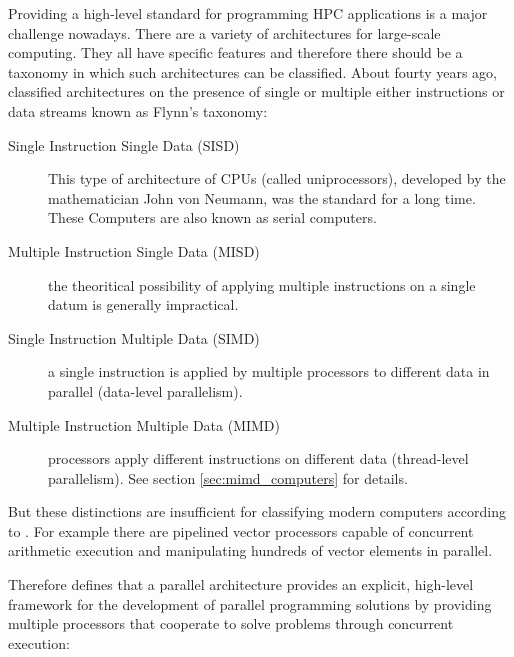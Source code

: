 Providing a high-level standard for programming HPC applications is a
major challenge nowadays. There are a variety of architectures for
large-scale computing. They all have specific features and 
therefore there should be a taxonomy in which such architectures can
be classified. About fourty years ago, \cite{flynn72sco} classified
architectures on the
presence of single or multiple either instructions or data streams
known as Flynn's taxonomy:
\begin{description}
\item[Single Instruction Single Data (SISD)]
  This type of architecture of CPUs (called uniprocessors),
  developed by the 
  mathematician John von Neumann, was the standard for a long
  time. These Computers are also known as serial computers. 
\item[Multiple Instruction Single Data (MISD)] the theoritical possibility
  of applying multiple instructions on a single datum is generally
  impractical.
\item[Single Instruction Multiple Data (SIMD)] 
  a single instruction is applied by multiple processors to different
  data in parallel (data-level parallelism). 
\item[Multiple Instruction Multiple Data (MIMD)] processors apply
  different instructions on different data (thread-level
  parallelism). See section \ref{sec:mimd_computers} for details. 
\end{description}

But these distinctions are insufficient for classifying modern
computers according to \cite{duncan90survey}. For example there are
pipelined vector processors capable of concurrent arithmetic execution and
manipulating hundreds of vector elements in parallel.

Therefore \cite{duncan90survey} defines that a parallel architecture
provides an explicit, high-level framework for 
the development of parallel programming solutions by providing
multiple processors that cooperate to solve problems through
concurrent execution:

